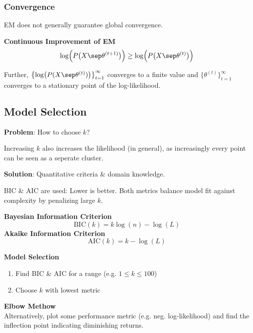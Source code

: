 \subsubsection{Convergence}

EM does not generally guarantee global convergence.

\theorem \textbf{Continuous Improvement of EM}\\
$$
    \log\Bigl( P\bigl( X \sep \theta^{(t+1)} \bigr) \Bigr) \geq \log\Bigl( P\bigl( X \sep \theta^{(t)} \bigr) \Bigr)
$$

Further, $\bigl\{ \log\bigl(P(X\sep\theta^{(t)})\bigr) \bigr\}_{t=1}^\infty$ converges to a finite value and $\bigl\{ \theta^{(t)} \bigr\}_{t=1}^\infty$ converges to a stationary point of the log-likelihood.

\subsection{Model Selection}

\textbf{Problem}: How to choose $k$?

{\footnotesize
    \remark Increasing $k$ also increases the likelihood (in general), as increasingly every point can be seen as a seperate cluster.
}

\textbf{Solution}: Quantitative criteria \& domain knowledge.

BIC \& AIC are used: Lower is better. Both metrics balance model fit against complexity by penalizing large $k$.

 \textbf{Bayesian Information Criterion} 
$$
    \text{BIC}(k) = k\log(n)-\log(L)
$$
 \textbf{Akaike Information Criterion}
$$
    \text{AIC}(k) = k - \log(L)
$$

\method \textbf{Model Selection}
\begin{enumerate}
    \item Find BIC \& AIC for a range (e.g. $1 \leq k \leq 100$) 
    \item Choose $k$ with lowest metric
\end{enumerate}

{\footnotesize
    \remark \textbf{Elbow Methow}\\
    Alternatively, plot some performance metric (e.g. neg. log-likelihood) and find the inflection point indicating diminishing returns.
}

